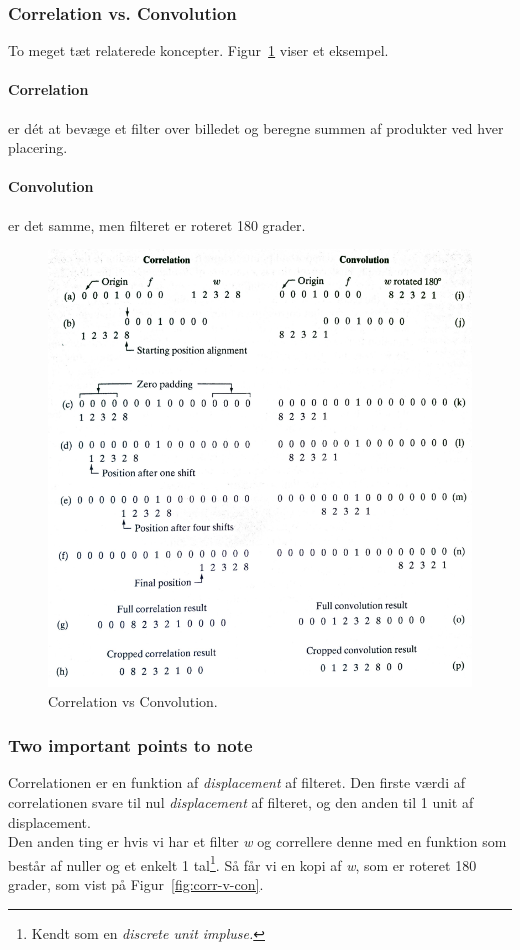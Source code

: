 \subsubsection{Correlation vs. Convolution}
To meget tæt relaterede koncepter. Figur~\ref{fig:correlation-vs-convolution} viser et eksempel.

\paragraph{Correlation} er dét at bevæge et filter over billedet og beregne summen af produkter ved hver placering.

\paragraph{Convolution} er det samme, men filteret er roteret 180 grader.

\begin{figure}[H]
	\centering
	\includegraphics[width=0.9\linewidth]{figs/spm02/correlation-vs-convolution}
	\caption{Correlation vs Convolution.}
	\label{fig:correlation-vs-convolution}
\end{figure}

\subsubsection{Two important points to note}
Correlationen er en funktion af \textit{displacement} af filteret. Den firste værdi af correlationen svare til nul \textit{displacement} af filteret, og den anden til 1 unit af displacement.\\
Den anden ting er hvis vi har et filter \textit{w} og correllere denne med en funktion som består af nuller og et enkelt 1 tal\footnote{Kendt som en \textit{discrete unit impluse.}}. Så får vi en kopi af \textit{w}, som er roteret 180 grader, som vist på Figur~\ref{fig:corr-v-con}.

